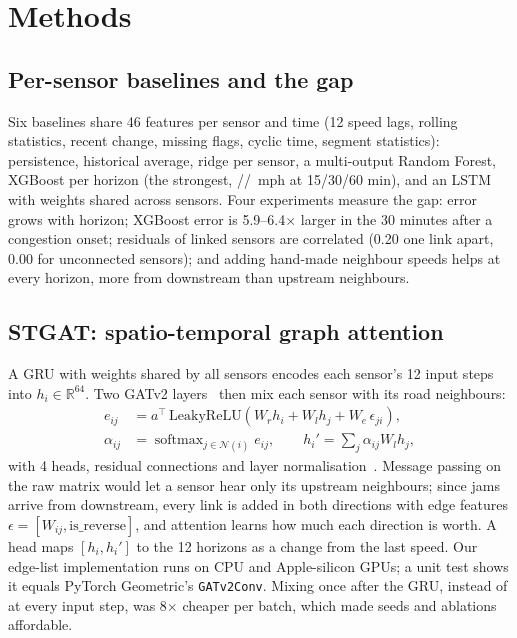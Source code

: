 \documentclass[conference]{IEEEtran}
\begin{document}
\section{Methods}
\subsection{Per-sensor baselines and the gap}
Six baselines share 46 features per sensor and time (12 speed lags, rolling statistics, recent change, missing flags,
cyclic time, segment statistics): persistence, historical average, ridge per sensor, a multi-output Random Forest,
XGBoost per horizon (the strongest, \XgbMAEFifteen/\XgbMAEThirty/\XgbMAESixty~mph at 15/30/60 min), and an LSTM with
weights shared across sensors. Four experiments measure the gap: error grows with horizon; XGBoost error is 5.9--6.4$\times$
larger in the 30 minutes after a congestion onset; residuals of linked sensors are correlated (0.20 one link apart,
0.00 for unconnected sensors); and adding hand-made neighbour speeds helps at every horizon, more from downstream than
upstream neighbours.

\subsection{STGAT: spatio-temporal graph attention}
A GRU with weights shared by all sensors encodes each sensor's 12 input steps into $h_i\in\mathbb{R}^{64}$. Two GATv2
layers~\cite{brody2022gatv2} then mix each sensor with its road neighbours:
\begin{align}
e_{ij}&=a^{\top}\,\mathrm{LeakyReLU}\!\left(W_r h_i+W_l h_j+W_e\,\epsilon_{ji}\right),\\
\alpha_{ij}&=\operatorname{softmax}_{j\in\mathcal{N}(i)} e_{ij},\qquad h_i'=\textstyle\sum_{j}\alpha_{ij}W_l h_j,
\end{align}
with 4 heads, residual connections and layer normalisation~\cite{ba2016layernorm}. Message passing on the raw matrix
would let a sensor hear only its upstream neighbours; since jams arrive from downstream, every link is added in both
directions with edge features $\epsilon=[W_{ij},\text{is\_reverse}]$, and attention learns how much each direction is
worth. A head maps $[h_i, h_i']$ to the 12 horizons as a change from the last speed. Our edge-list implementation runs on
CPU and Apple-silicon GPUs; a unit test shows it equals PyTorch Geometric's \texttt{GATv2Conv}. Mixing once after the
GRU, instead of at every input step, was 8$\times$ cheaper per batch, which made seeds and ablations affordable.
\end{document}
